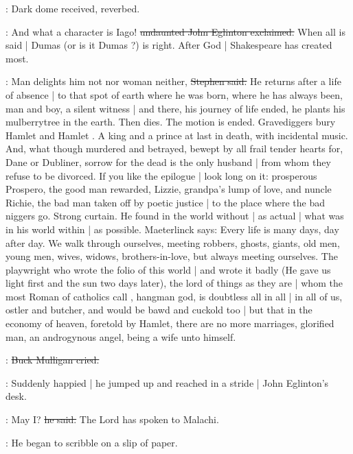 \StephenInt:
Dark dome received,
reverbed.

\eglinton:
And what a character is Iago!
\sout{undaunted John Eglinton exclaimed.}
When all is said |
Dumas  (or is it Dumas ?) is right.
After God |
Shakespeare has created most.

\Stephen:
Man delights him not nor woman neither,
\sout{Stephen said.}
He returns after a life of absence |
to that spot of earth where he was born,
where he has always been,
man and boy,
a silent witness |
and there,
his journey of life ended,
he plants his mulberrytree in the earth.
Then dies.
The motion is ended.
Gravediggers bury Hamlet  and Hamlet .
A king and a prince at last in death,
with incidental music.
And, what though murdered and betrayed,
bewept by all frail tender hearts for,
Dane or Dubliner,
sorrow for the dead is the only husband |
from whom they refuse to be divorced.
If you like the epilogue |
look long on it:
prosperous Prospero,
the good man rewarded,
Lizzie, grandpa's lump of love,
and nuncle Richie,
the bad man taken off by poetic justice |
to the place where the bad niggers go.
Strong curtain.
He found in the world without |
as actual |
what was in his world within |
as possible.
Maeterlinck says:
Every life is many days,
day after day.
We walk through ourselves,
meeting robbers, ghosts, giants,
old men, young men,
wives, widows,
brothers-in-love,
but always meeting ourselves.
The playwright who wrote the folio of this world |
and wrote it badly
(He gave us light first and the sun two days later),
the lord of things as they are |
whom the most Roman of catholics call ,
hangman god,
is doubtless all in all |
in all of us,
ostler and butcher,
and would be bawd and cuckold too |
but that in the economy of heaven,
foretold by Hamlet,
there are no more marriages,
glorified man,
an androgynous angel,
being a wife unto himself.

\mulligan:
\sout{Buck Mulligan cried.}

:
Suddenly happied |
he jumped up and reached in a stride |
John Eglinton's desk.

\mulligan:
May I?
\sout{he said.}
The Lord has spoken to Malachi.

:
He began to scribble on a slip of paper.

